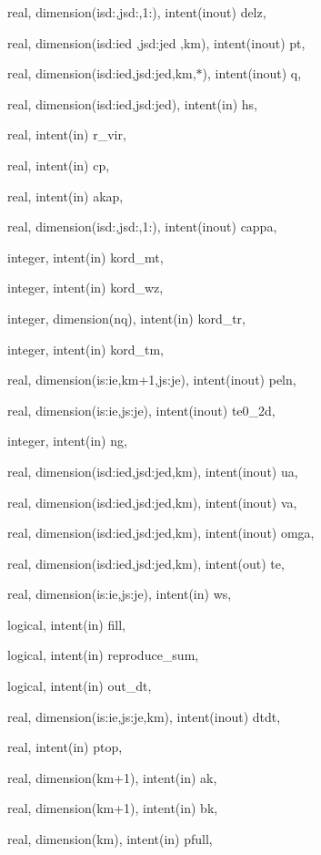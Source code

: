 {\begin{DoxyParamCaption}
\item[{real, dimension(isd\-:,jsd\-:,1\-:), intent(inout)}]{delz, }
\item[{real, dimension(isd\-:ied  ,jsd\-:jed  ,km), intent(inout)}]{pt, }
\item[{real, dimension(isd\-:ied,jsd\-:jed,km,$\ast$), intent(inout)}]{q, }
\item[{real, dimension(isd\-:ied,jsd\-:jed), intent(in)}]{hs, }
\item[{real, intent(in)}]{r\-\_\-vir, }
\item[{real, intent(in)}]{cp, }
\item[{real, intent(in)}]{akap, }
\item[{real, dimension(isd\-:,jsd\-:,1\-:), intent(inout)}]{cappa, }
\item[{integer, intent(in)}]{kord\-\_\-mt, }
\item[{integer, intent(in)}]{kord\-\_\-wz, }
\item[{integer, dimension(nq), intent(in)}]{kord\-\_\-tr, }
\item[{integer, intent(in)}]{kord\-\_\-tm, }
\item[{real, dimension(is\-:ie,km+1,js\-:je), intent(inout)}]{peln, }
\item[{real, dimension(is\-:ie,js\-:je), intent(inout)}]{te0\-\_\-2d, }
\item[{integer, intent(in)}]{ng, }
\item[{real, dimension(isd\-:ied,jsd\-:jed,km), intent(inout)}]{ua, }
\item[{real, dimension(isd\-:ied,jsd\-:jed,km), intent(inout)}]{va, }
\item[{real, dimension(isd\-:ied,jsd\-:jed,km), intent(inout)}]{omga, }
\item[{real, dimension(isd\-:ied,jsd\-:jed,km), intent(out)}]{te, }
\item[{real, dimension(is\-:ie,js\-:je), intent(in)}]{ws, }
\item[{logical, intent(in)}]{fill, }
\item[{logical, intent(in)}]{reproduce\-\_\-sum, }
\item[{logical, intent(in)}]{out\-\_\-dt, }
\item[{real, dimension(is\-:ie,js\-:je,km), intent(inout)}]{dtdt, }
\item[{real, intent(in)}]{ptop, }
\item[{real, dimension(km+1), intent(in)}]{ak, }
\item[{real, dimension(km+1), intent(in)}]{bk, }
\item[{real, dimension(km), intent(in)}]{pfull, }

\end{DoxyParamCaption}}
